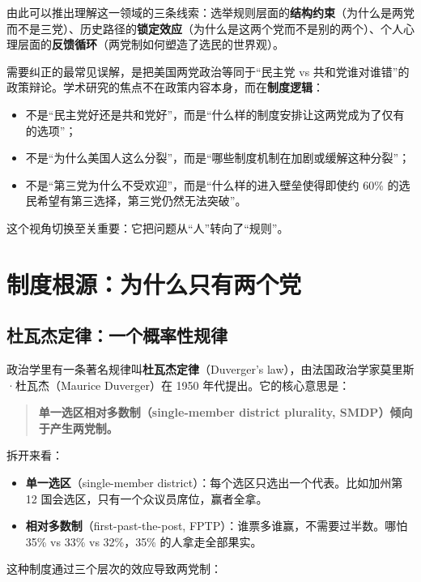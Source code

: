 \documentclass[12pt,a4paper]{ctexart}
\begin{document}
由此可以推出理解这一领域的三条线索：选举规则层面的\textbf{结构约束}（为什么是两党而不是三党）、历史路径的\textbf{锁定效应}（为什么是这两个党而不是别的两个）、个人心理层面的\textbf{反馈循环}（两党制如何塑造了选民的世界观）。

需要纠正的最常见误解，是把美国两党政治等同于``民主党 vs 共和党谁对谁错''的政策辩论。学术研究的焦点不在政策内容本身，而在\textbf{制度逻辑}：

\begin{itemize}
  \item 不是``民主党好还是共和党好''，而是``什么样的制度安排让这两党成为了仅有的选项''；
  \item 不是``为什么美国人这么分裂''，而是``哪些制度机制在加剧或缓解这种分裂''；
  \item 不是``第三党为什么不受欢迎''，而是``什么样的进入壁垒使得即使约 60\% 的选民希望有第三选择，第三党仍然无法突破''。
\end{itemize}

这个视角切换至关重要：它把问题从``人''转向了``规则''。

\section{制度根源：为什么只有两个党}

\subsection{杜瓦杰定律：一个概率性规律}

政治学里有一条著名规律叫\textbf{杜瓦杰定律}（Duverger's law），由法国政治学家莫里斯·杜瓦杰（Maurice Duverger）在 1950 年代提出。它的核心意思是：

\begin{quote}
\textbf{单一选区相对多数制（single-member district plurality, SMDP）倾向于产生两党制。}
\end{quote}

拆开来看：

\begin{itemize}
  \item \textbf{单一选区}（single-member district）：每个选区只选出一个代表。比如加州第 12 国会选区，只有一个众议员席位，赢者全拿。
  \item \textbf{相对多数制}（first-past-the-post, FPTP）：谁票多谁赢，不需要过半数。哪怕 35\% vs 33\% vs 32\%，35\% 的人拿走全部果实。
\end{itemize}

这种制度通过三个层次的效应导致两党制：
\end{document}

